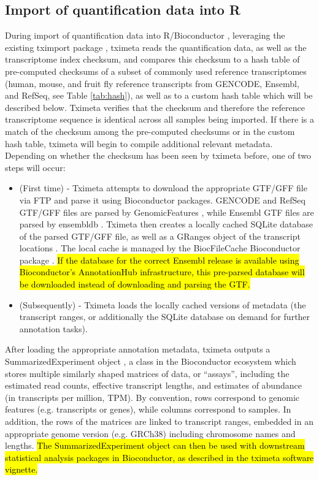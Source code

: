 \subsection*{Import of quantification data into R}

During import of quantification data into R/Bioconductor
\cite{bioc}, leveraging the existing tximport package
\cite{tximport}, tximeta reads the quantification data, as well as
the transcriptome index checksum, and compares this checksum to a hash
table of pre-computed checksums of a subset of commonly used reference
transcriptomes (human, mouse, and fruit fly reference transcripts from
GENCODE, Ensembl, and RefSeq, see Table \ref{tab:hash}), as well as to a
custom hash table which will be described below. Tximeta verifies that
the checksum and therefore the reference transcriptome sequence is
identical across all samples being imported. If there is a match of
the checksum among the pre-computed checksums or in the custom hash table,
tximeta will begin to compile additional relevant
metadata. Depending on whether the checksum has been seen by tximeta
before, one of two steps will occur:

\begin{itemize}
\item (First time) - Tximeta attempts to download the appropriate GTF/GFF
  file via FTP and parse it using Bioconductor packages. 
  GENCODE and RefSeq GTF/GFF files are parsed
  by GenomicFeatures \cite{granges}, while Ensembl GTF files are
  parsed by ensembldb \cite{ensembldb}. Tximeta then creates a
  locally cached SQLite database of the parsed GTF/GFF file, as well as a
  GRanges object of the transcript locations \cite{granges}. The
  local cache is managed by the BiocFileCache Bioconductor package
  \cite{biocfilecache}. \hl{If the database for the correct Ensembl
    release is available using Bioconductor's AnnotationHub
    infrastructure, this pre-parsed database will be downloaded
    instead of downloading and parsing the GTF.}
\item (Subsequently) - Tximeta loads the locally cached versions of
  metadata (the transcript ranges, or additionally the SQLite database
  on demand for further annotation tasks).
\end{itemize}

After loading the appropriate annotation metadata, tximeta outputs a
SummarizedExperiment object \cite{granges}, a class in the
Bioconductor ecosystem which stores multiple similarly shaped matrices
of data, or ``assays'', including the estimated read counts, effective
transcript lengths, and estimates of abundance (in transcripts per
million, TPM). By convention, rows correspond to genomic features
(e.g. transcripts or genes), while columns correspond to samples. In
addition, the rows of the matrices are linked to transcript ranges,
embedded in an appropriate genome version (e.g. GRCh38) including
chromosome names and lengths. \hl{The SummarizedExperiment object can
then be used with downstream statistical analysis packages in
Bioconductor, as described in the tximeta software vignette.}

